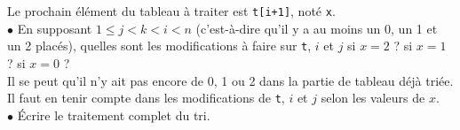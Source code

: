 Le prochain élément du tableau à traiter est \texttt{t[i+1]}, noté \texttt{x}.\\
$\bullet$ En supposant $1\leq j<k<i<n$ (c'est-à-dire qu'il y a au moins un 0, un
1 et un 2 placés), quelles sont les modifications à faire sur \texttt{t}, $i$ et
$j$ si $x=2$ ? si $x=1$ ? si $x=0$ ?\\

Il se peut qu'il n'y ait pas encore de 0, 1 ou 2 dans la partie de tableau déjà
triée. Il faut en tenir compte dans les modifications de \texttt{t}, $i$ et $j$
selon les valeurs de $x$.\\

\noindent$\bullet$  Écrire le traitement complet du tri.